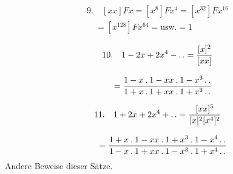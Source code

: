 \[
\begin{gathered}9.\quad [xx]Fx=[x^8]Fx^4=[x^{32}]Fx^{16}\\[8pt]\quad{}=[x^{128}]Fx^{64}=\mathrm{usw.}=1\end{gathered}
\]

\[
\begin{gathered}10.\quad1-2x+2x^4-\mathinner{.\,.}
=\frac{[x]^2}{[xx]}
\\[8pt]\quad{}=\frac{1-x\mathbin{.}1-xx\mathbin{.}1-x^3\mathinner{.\,.}}
{1+x\mathbin{.}1+xx\mathbin{.}1+x^3\mathinner{.\,.}}\end{gathered}
\]

\[
\begin{gathered}11.\quad1+2x+2x^4+\mathinner{.\,.}
=\frac{[xx]^5}{[x]^2[x^4]^2}
\\[8pt]\quad{}=\frac{1+x\mathbin{.}1-xx\mathbin{.}1+x^3\mathbin{.}1-x^4\mathinner{.\,.}}
{1-x\mathbin{.}1+xx\mathbin{.}1-x^3\mathbin{.}1+x^4\mathinner{.\,.}}\end{gathered}
\]
Andere Beweise dieser Sätze.

